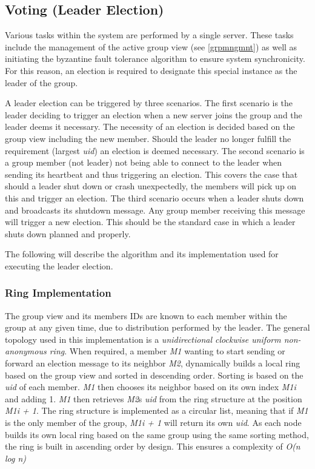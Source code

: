 \documentclass[runningheads]{llncs}
\begin{document}
\subsection{Voting (Leader Election)}

Various tasks within the system are performed by a single server. These tasks include the management of the active group view (see \ref{grpmngmnt}) as well as initiating the byzantine fault tolerance algorithm to ensure system synchronicity. For this reason, an election is required to designate this special instance as the leader of the group.

A leader election can be triggered by three scenarios. The first scenario is the leader deciding to trigger an election when a new server joins the group and the leader deems it necessary. The necessity of an election is decided based on the group view including the new member. Should the leader no longer fulfill the requirement (largest \textit{uid}) an election is deemed necessary. The second scenario is a group member (not leader) not being able to connect to the leader when sending its heartbeat and thus triggering an election. This covers the case that should a leader shut down or crash unexpectedly, the members will pick up on this and trigger an election. The third scenario occurs when a leader shuts down and broadcasts its shutdown message. Any group member receiving this message will trigger a new election. This should be the standard case in which a leader shuts down planned and properly.

The following will describe the algorithm and its implementation used for executing the leader election.

\subsubsection{Ring Implementation} \label{ring_imp}
The group view and its members IDs are known to each member within the group at any given time, due to distribution performed by the leader. The general topology used in this implementation is a \textit{unidirectional clockwise uniform non-anonymous ring}. When required, a member \textit{M1} wanting to start sending or forward an election message to its neighbor \textit{M2}, dynamically builds a local ring based on the group view and sorted in descending order. Sorting is based on the \textit{uid} of each member. \textit{M1} then chooses its neighbor based on its own index \textit{M1i} and adding 1. \textit{M1} then retrieves \textit{M2}s \textit{uid} from the ring structure at the position \textit{M1i + 1}. The ring structure is implemented as a circular list, meaning that if \textit{M1} is the only member of the group, \textit{M1i + 1} will return its own \textit{uid}. As each node builds its own local ring based on the same group using the same sorting method, the ring is built in ascending order by design. This ensures a complexity of \textit{O(n log n)}
\end{document}

